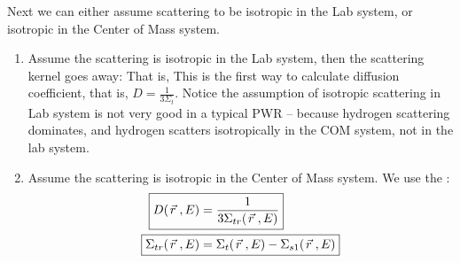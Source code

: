 \documentclass{school-22.211-notes}
\begin{document}
Next we can either assume scattering to be isotropic in the Lab system, or isotropic in the Center of Mass system. 
\begin{enumerate}
\item Assume the scattering is isotropic in the Lab system, then the scattering kernel goes away:
That is, 
This is the first way to calculate diffusion coefficient, that is, $D = \frac{1}{3 \Sigma_t}$. Notice the assumption of isotropic scattering in Lab system is not very good in a typical PWR -- because hydrogen scattering dominates, and hydrogen scatters isotropically in the COM system, not in the lab system. 


\item Assume the scattering is isotropic in the Center of Mass system. We use the :
\begin{align}
  \Aboxed{ D(\vecr, E) &= \frac{1}{3 \Sigma_{tr} (\vecr, E) } } \\
  \Aboxed{ \Sigma_{tr} (\vecr, E) &= \Sigma_t(\vecr, E) - \Sigma_{s1} (\vecr, E) } 
\end{align} 
\end{enumerate}
\end{document}
